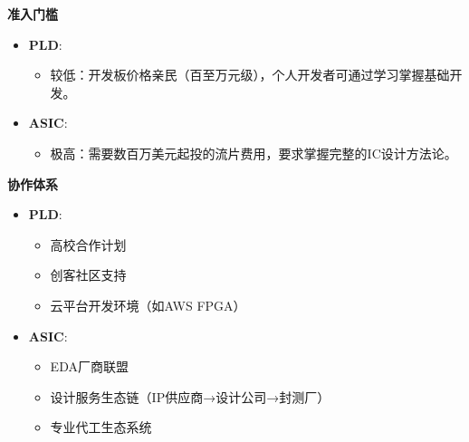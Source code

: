 \documentclass[
  ignorenonframetext,
  chinese,
]{beamer}
\providecommand{\tightlist}{%
  \setlength{\itemsep}{0pt}\setlength{\parskip}{0pt}}
\begin{document}
\begin{frame}
\textbf{准入门槛}

\begin{itemize}
\tightlist
\item
  \textbf{PLD}:

  \begin{itemize}
  \tightlist
  \item
    较低：开发板价格亲民（百至万元级），个人开发者可通过学习掌握基础开发。\\
  \end{itemize}
\item
  \textbf{ASIC}:

  \begin{itemize}
  \tightlist
  \item
    极高：需要数百万美元起投的流片费用，要求掌握完整的IC设计方法论。
  \end{itemize}
\end{itemize}
\end{frame}

\begin{frame}
\textbf{协作体系}

\begin{itemize}
\tightlist
\item
  \textbf{PLD}:

  \begin{itemize}
  \tightlist
  \item
    高校合作计划\\
  \item
    创客社区支持\\
  \item
    云平台开发环境（如AWS FPGA）\\
  \end{itemize}
\item
  \textbf{ASIC}:

  \begin{itemize}
  \tightlist
  \item
    EDA厂商联盟\\
  \item
    设计服务生态链（IP供应商→设计公司→封测厂）\\
  \item
    专业代工生态系统
  \end{itemize}
\end{itemize}
\end{frame}
\end{document}
